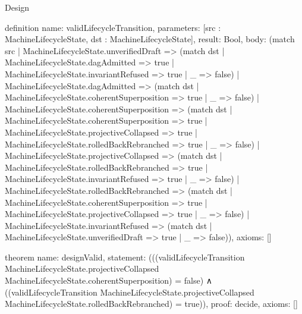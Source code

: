 \begin{lexlean}{Design}
\begin{semanticmodule}
definition{
  name: validLifecycleTransition,
  parameters: [src : MachineLifecycleState, dst : MachineLifecycleState],
  result: Bool,
  body: (match src
    | MachineLifecycleState.unverifiedDraft =>
        (match dst
          | MachineLifecycleState.dagAdmitted => true
          | MachineLifecycleState.invariantRefused => true
          | _ => false)
    | MachineLifecycleState.dagAdmitted =>
        (match dst
          | MachineLifecycleState.coherentSuperposition => true
          | _ => false)
    | MachineLifecycleState.coherentSuperposition =>
        (match dst
          | MachineLifecycleState.coherentSuperposition => true
          | MachineLifecycleState.projectiveCollapsed => true
          | MachineLifecycleState.rolledBackRebranched => true
          | _ => false)
    | MachineLifecycleState.projectiveCollapsed =>
        (match dst
          | MachineLifecycleState.rolledBackRebranched => true
          | MachineLifecycleState.invariantRefused => true
          | _ => false)
    | MachineLifecycleState.rolledBackRebranched =>
        (match dst
          | MachineLifecycleState.coherentSuperposition => true
          | MachineLifecycleState.projectiveCollapsed => true
          | _ => false)
    | MachineLifecycleState.invariantRefused =>
        (match dst
          | MachineLifecycleState.unverifiedDraft => true
          | _ => false)),
  axioms: []
}

theorem{
  name: designValid,
  statement: (((validLifecycleTransition
      MachineLifecycleState.projectiveCollapsed
      MachineLifecycleState.coherentSuperposition) = false)
    ∧ ((validLifecycleTransition
      MachineLifecycleState.projectiveCollapsed
      MachineLifecycleState.rolledBackRebranched) = true)),
  proof: decide{},
  axioms: []
}

\end{semanticmodule}
\end{lexlean}
